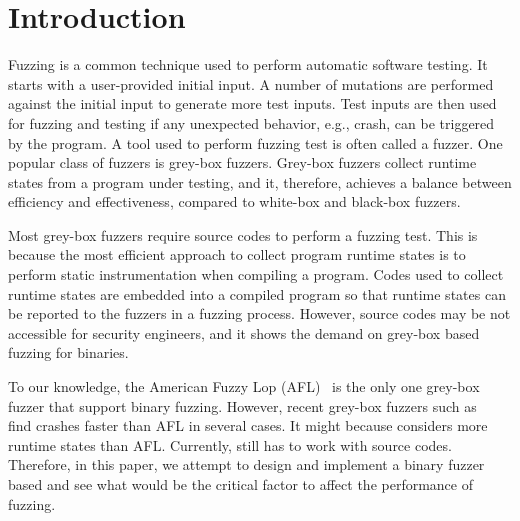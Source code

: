 
\section{Introduction}
\label{sec:intro}

Fuzzing is a common technique used to perform automatic software testing. It starts with a user-provided initial input. A number of mutations are performed against the initial input to generate more test inputs. Test inputs are then used for fuzzing and testing if any unexpected behavior, e.g., crash, can be triggered by the program.
%
A tool used to perform fuzzing test is often called a fuzzer.
One popular class of fuzzers is grey-box fuzzers.
Grey-box fuzzers collect runtime states from a program under testing, and it, therefore, achieves a balance between efficiency and effectiveness, compared to white-box and black-box fuzzers.

Most grey-box fuzzers require source codes to perform a fuzzing test.
This is because the most efficient approach to collect program runtime states is to perform static instrumentation when compiling a program.
Codes used to collect runtime states are embedded into a compiled program so that runtime states can be reported to the fuzzers in a fuzzing process.
However, source codes may be not accessible for security engineers, and it shows the demand on grey-box based fuzzing for binaries.

To our knowledge, the American Fuzzy Lop (AFL)~\cite{AFL} is the only one grey-box fuzzer that support binary fuzzing. However, recent grey-box fuzzers such as \libfuzzer~\cite{libfuzzer} find crashes faster than AFL in several cases. It might because \libfuzzer considers more runtime states than AFL. Currently, \libfuzzer still has to work with source codes. Therefore, in this paper, we attempt to design and implement a binary fuzzer based \libfuzzer and see what would be the critical factor to affect the performance of fuzzing.
